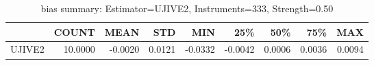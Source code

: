\begin{table}[ht]
\centering
\caption{bias summary: Estimator=UJIVE2, Instruments=333, Strength=0.50}
\begin{tabular}{lrrrrrrrr}
\toprule
 & COUNT & MEAN & STD & MIN & 25\% & 50\% & 75\% & MAX \\
\midrule
UJIVE2 & 10.0000 & -0.0020 & 0.0121 & -0.0332 & -0.0042 & 0.0006 & 0.0036 & 0.0094 \\
\bottomrule
\end{tabular}
\end{table}
